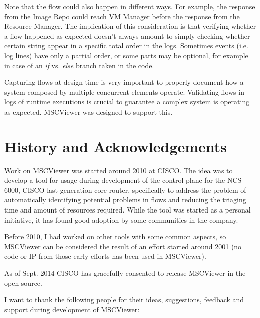 \documentclass[11pt, twoside, titlepage]{book}
\newcommand{\prog}{MSCViewer}
\begin{document}
Note that the flow could also happen in different ways. For example, 
the response from the Image Repo could reach VM Manager before the response from
the Resource Manager. The implication of this consideration is that verifying
whether a flow happened as expected doesn't always amount to simply checking
whether certain string appear in a specific total order in the logs. Sometimes
events (i.e. log lines) have only a partial order, or some parts may be
optional, for example in case of an \textit{if} vs. \textit{else} branch taken 
in the code.

Capturing flows at design time is very
important to properly document how a system composed by multiple concurrent
elements operate. Validating flows in logs of runtime executions is crucial to
guarantee a complex system is operating as expected. \prog{} was designed  to
support this.


\section{History and Acknowledgements}
Work on \prog{} was started around 2010 at CISCO. The idea was to develop a tool
for usage during development of the control plane for the NCS-6000, CISCO 
last-generation core router, specifically to address the problem of
automatically identifying potential problems in flows and reducing the triaging 
time and amount of resources required. While the tool was started as a personal
initiative, it has found good adoption by some communities in the company. 

Before 2010, I had worked on other tools with some common aspects, so \prog{} can
be considered the result of an effort started around 2001 
(no code or IP from those early efforts has been used in \prog{}). 

As of Sept. 2014 CISCO has gracefully consented to release \prog{} in the
open-source. 

I want to thank the following people for their ideas, suggestions, feedback and
support during development of \prog{}:
\end{document}
